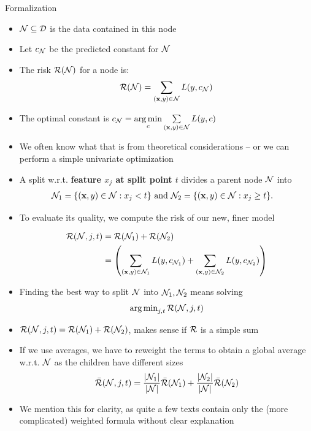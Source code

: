 \documentclass[11pt,compress,t,notes=noshow, xcolor=table]{beamer}
\begin{document}
\begin{vbframe}{Formalization}

\begin{itemize}
\item $\mathcal{N} \subseteq \mathcal{D}$ is the data contained in this node
\item Let $c_{\mathcal{N}}$ be the predicted constant for $\mathcal{N}$ %
\item The risk $\mathcal{R}(\mathcal{N})$ for a node is:
  $$\mathcal{R}(\mathcal{N}) = \sum\limits_{(\mathbf{x}, y) \in \mathcal{N}} L(y, c_{\mathcal{N}})$$
\item The optimal constant is $c_{\mathcal{N}} = \mathop{\mathrm{arg\,min}}\limits_c \sum\limits_{(\mathbf{x}, y) \in \mathcal{N}} L(y, c)$ 
\item We often know what that is from theoretical considerations -- or we can perform a simple univariate optimization
\end{itemize}

\framebreak

\begin{itemize}
\item A split w.r.t. \textbf{feature $x_j$ at split point $t$} divides a parent node $\mathcal{N}$ into 
  \begin{align*}
    \mathcal{N}_1 &= \{ (\mathbf{x}, y) \in \mathcal{N}: x_j < t \} \text{ and } \mathcal{N}_2 = \{ (\mathbf{x}, y) \in \mathcal{N}: x_j \geq t \}.
  \end{align*}
\item   
  To evaluate its quality, we compute the risk of our new, finer model
  
     \begin{align*}
      \mathcal{R}(\mathcal{N}, j, t) &=  \mathcal{R}(\mathcal{N}_1) +  \mathcal{R}(\mathcal{N}_2) \\
                  &= \left(\sum\limits_{(\mathbf{x},y) \in \mathcal{N}_1} L(y, c_{\mathcal{N}_1}) + \sum\limits_{(\mathbf{x},y) \in \mathcal{N}_2} L(y, c_{\mathcal{N}_2})\right)
      \end{align*}
  \item Finding the best way to split $\mathcal{N}$ into $\mathcal{N}_1, \mathcal{N}_2$ means solving
  $$\operatorname{arg\,min}_{j, t} \mathcal{R}(\mathcal{N}, j, t)$$
\end{itemize}

\framebreak
\begin{itemize}

\item $\mathcal{R}(\mathcal{N}, j, t) =  \mathcal{R}(\mathcal{N}_1) +  \mathcal{R}(\mathcal{N}_2)$, makes sense if $\mathcal{R}$ is a simple sum
\item If we use averages, we have to reweight the terms to obtain a global average w.r.t. $\mathcal{N}$ as the children have different sizes
     \begin{align*}
      \bar{\mathcal{R}}(\mathcal{N}, j, t) &= \frac{|\mathcal{N}_1|}{|\mathcal{N}|} \bar{\mathcal{R}}(\mathcal{N}_1) + \frac{|\mathcal{N}_2|}{|\mathcal{N}|} \bar{\mathcal{R}}(\mathcal{N}_2) \\
      \end{align*}
\item We mention this for clarity, as quite a few texts contain only the (more complicated) weighted formula without clear explanation

\end{itemize}
\end{vbframe}



\endlecture
\end{document}
